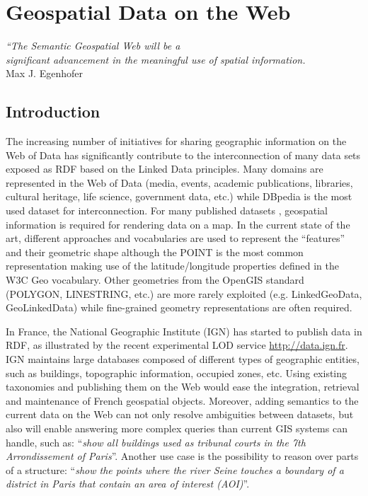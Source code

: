 \chapter{Geospatial Data on the Web}
\label{ch:ch1}

\begin{flushright}
\textit{``The Semantic Geospatial Web will be a \\ significant advancement in the 
 meaningful use of spatial information.}\cite{egenhofer12}\\
 Max J. Egenhofer 
 
\end{flushright}


\section*{Introduction}
The increasing number of initiatives for sharing geographic information on the Web of Data has significantly contribute to the interconnection of many data sets exposed as RDF based on the Linked Data principles. Many domains are represented in the Web of Data (media, events, academic publications, libraries, cultural heritage, life science, government data, etc.) while DBpedia is the most used dataset for interconnection. For many published datasets , geospatial information is required for rendering data on a map. In the current state of the art, different approaches and vocabularies are used to represent the ``features'' and their geometric shape although the POINT is the most common representation making use of the latitude/longitude properties defined in the W3C Geo vocabulary. Other geometries from the OpenGIS standard (POLYGON, LINESTRING, etc.) are more rarely exploited (e.g. LinkedGeoData, GeoLinkedData) while fine-grained geometry representations are often required.

In France, the National Geographic Institute (IGN) has started to publish data in RDF, as illustrated by the recent experimental LOD service \url{http://data.ign.fr}. IGN maintains large databases composed of different types of geographic entities, such as  buildings, topographic information, occupied zones, etc. Using existing taxonomies and publishing them on the Web would ease the integration, retrieval and maintenance of French geospatial objects. Moreover, adding semantics to the current data on the Web can not only resolve ambiguities between datasets, but also will enable answering more complex queries than current GIS systems can handle, such as: ``\emph{show all buildings used as tribunal courts in the 7th Arrondissement of Paris}''. Another use case is the possibility to reason over parts of a structure: ``\emph{show the points where the river Seine touches a boundary of a district in Paris that contain an area of interest (AOI)}''.

